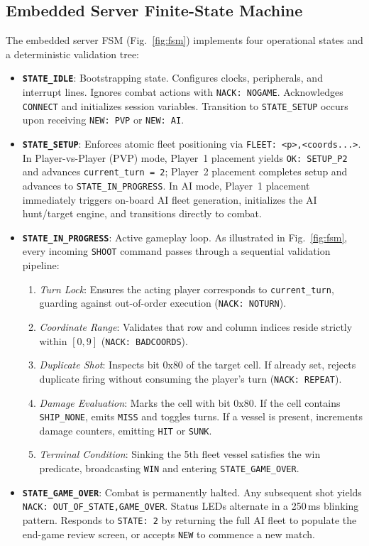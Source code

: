 \subsection{Embedded Server Finite-State Machine}
The embedded server FSM (Fig.~\ref{fig:fsm}) implements four operational states and a deterministic validation tree:
\begin{itemize}
    \item \textbf{\texttt{STATE\_IDLE}}: Bootstrapping state. Configures clocks, peripherals, and interrupt lines. Ignores combat actions with \texttt{NACK: NOGAME}. Acknowledges \texttt{CONNECT} and initializes session variables. Transition to \texttt{STATE\_SETUP} occurs upon receiving \texttt{NEW: PVP} or \texttt{NEW: AI}.
    \item \textbf{\texttt{STATE\_SETUP}}: Enforces atomic fleet positioning via \texttt{FLEET: <p>,<coords...>}. In Player-vs-Player (PVP) mode, Player~1 placement yields \texttt{OK: SETUP\_P2} and advances \texttt{current\_turn = 2}; Player~2 placement completes setup and advances to \texttt{STATE\_IN\_PROGRESS}. In AI mode, Player~1 placement immediately triggers on-board AI fleet generation, initializes the AI hunt/target engine, and transitions directly to combat.
    \item \textbf{\texttt{STATE\_IN\_PROGRESS}}: Active gameplay loop. As illustrated in Fig.~\ref{fig:fsm}, every incoming \texttt{SHOOT} command passes through a sequential validation pipeline:
    \begin{enumerate}
        \item \textit{Turn Lock}: Ensures the acting player corresponds to \texttt{current\_turn}, guarding against out-of-order execution (\texttt{NACK: NOTURN}).
        \item \textit{Coordinate Range}: Validates that row and column indices reside strictly within $[0, 9]$ (\texttt{NACK: BADCOORDS}).
        \item \textit{Duplicate Shot}: Inspects bit $0\text{x}80$ of the target cell. If already set, rejects duplicate firing without consuming the player's turn (\texttt{NACK: REPEAT}).
        \item \textit{Damage Evaluation}: Marks the cell with bit $0\text{x}80$. If the cell contains \texttt{SHIP\_NONE}, emits \texttt{MISS} and toggles turns. If a vessel is present, increments damage counters, emitting \texttt{HIT} or \texttt{SUNK}.
        \item \textit{Terminal Condition}: Sinking the 5th fleet vessel satisfies the win predicate, broadcasting \texttt{WIN} and entering \texttt{STATE\_GAME\_OVER}.
    \end{enumerate}
    \item \textbf{\texttt{STATE\_GAME\_OVER}}: Combat is permanently halted. Any subsequent shot yields \texttt{NACK: OUT\_OF\_STATE,GAME\_OVER}. Status LEDs alternate in a 250\,ms blinking pattern. Responds to \texttt{STATE: 2} by returning the full AI fleet to populate the end-game review screen, or accepts \texttt{NEW} to commence a new match.
\end{itemize}

